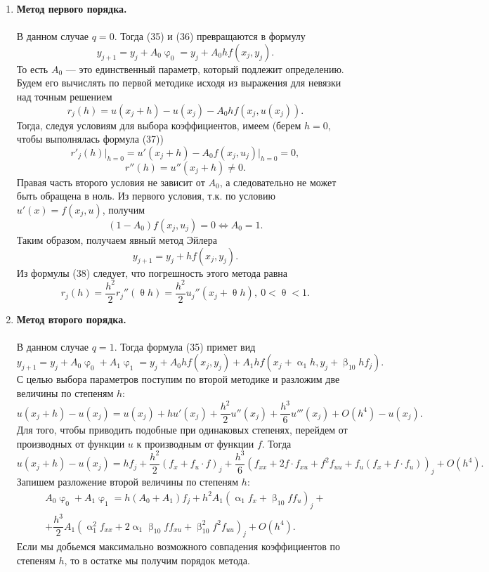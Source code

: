 \documentclass[a4paper, 12pt]{report}
\numberwithin{equation}{section}
\renewcommand{\alpha}{\upalpha}
\renewcommand{\beta}{\upbeta}
\renewcommand{\varphi}{\upvarphi}
\renewcommand{\theta}{\uptheta}
\begin{document}
	\begin{enumerate}
		\item \textbf{Метод первого порядка.}\\\\
		В данном случае $q = 0$. Тогда (35) и (36) превращаются в формулу
		$$y_{j+1} = y_j + A_0 \varphi_0 = y_j + A_0 h f(x_j, y_j).$$
		То есть $A_0$ --- это единственный параметр, который подлежит определению. Будем его вычислять по первой методике исходя из выражения для невязки над точным решением
		$$r_j(h) = u(x_j + h) - u(x_j) - A_0hf(x_j, u(x_j)).$$
		Тогда, следуя условиям для выбора коэффициентов, имеем (берем $h=0$, чтобы выполнялась формула (37)) 
		$$
		r'_j(h)\Big|_{h=0} = u'(x_j + h) - A_0 f(x_j, u_j)\Big|_{h=0} = 0,$$
		$$
		r''(h) = u''(x_j + h) \ne 0.
		$$
		Правая часть второго условия не зависит от $A_0$, а следовательно не может быть обращена в ноль. Из первого условия, т.к. по условию $u'(x) = f(x_j, u)$, получим
		$$(1-A_0)f(x_j, u_j) = 0 \Longleftrightarrow A_0 = 1.$$
		Таким образом, получаем явный метод Эйлера
		$$y_{j+1} = y_j + h f(x_j, y_j).$$
		Из формулы (38) следует, что погрешность этого метода равна $$r_j(h) = \dfrac{h^2}{2}r_j''(\theta h)=\dfrac{h^2}{2}u_j''(x_j + \theta h),\ 0<\theta <1.$$
		\item \textbf{Метод второго порядка.}\\\\
		В данном случае $q=1$. Тогда формула (35) примет вид
		$$y_{j+1} = y_j + A_0\varphi_0 + A_1\varphi_1 = y_j + A_0 hf(x_j, y_j) + A_1 hf(x_j + \alpha_1 h, y_j + \beta_{10} hf_j).$$
		С целью выбора параметров поступим по второй методике и разложим две величины по степеням $h$:
		$$u(x_j + h) - u(x_j) = u(x_j) + hu'(x_j) + \dfrac{h^2}{2}u''(x_j)+ \dfrac{h^3}{6}u'''(x_j) + O(h^4) - u(x_j).$$
		Для того, чтобы приводить подобные при одинаковых степенях, перейдем от производных от функции $u$ к производным от функции $f$. Тогда
		$$u(x_j + h) - u(x_j) = hf_j + \dfrac{h^2}{2}\left(f_x + f_u\cdot f\right)_j+ \dfrac{h^3}{6}\left(f_{xx} + 2f\cdot f_{x u}+f^2 f_{uu}+f_u(f_x + f\cdot f_u) \right)_j + O(h^4).$$
		Запишем разложение второй величины по степеням $h$:
		\begin{multline*}
			A_0\varphi_0 + A_1\varphi_1 = h(A_0 + A_1)f_j + h^2A_1(\alpha_1 f_x + \beta_{10} f f_u)_j +\\+ \dfrac{h^3}{2}A_1(\alpha_1^2 f_{xx} + 2\alpha_1 \beta_{10} f f_{xu} + \beta_{10}^2 f^2 f_{uu})_j + O(h^4).
		\end{multline*}
		Если мы добьемся максимально возможного совпадения коэффициентов по степеням $h$, то в остатке мы получим порядок метода.\\\\

\end{enumerate}
\end{document}
